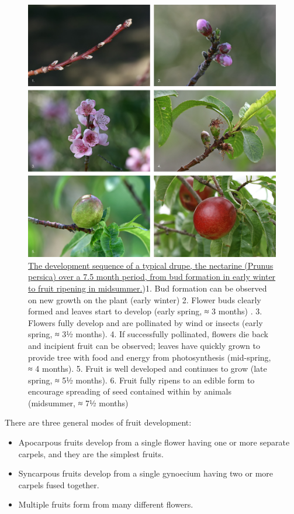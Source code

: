 \begin{figure}

{\centering \includegraphics[width=0.7\linewidth]{./figures/plants/Nectarine_Fruit_Development} 

}

\caption{\href{https://commons.wikimedia.org/wiki/File:Nectarine_Fruit_Development.jpg}{The development sequence of a typical drupe, the nectarine (Prunus persica) over a 7.5 month period, from bud formation in early winter to fruit ripening in midsummer.})1. Bud formation can be observed on new growth on the plant (early winter) 2. Flower buds clearly formed and leaves start to develop (early spring, ≈ 3 months) . 3. Flowers fully develop and are pollinated by wind or insects (early spring, ≈ 3½ months). 4. If successfully pollinated, flowers die back and incipient fruit can be observed; leaves have quickly grown to provide tree with food and energy from photosynthesis (mid-spring, ≈ 4 months). 5. Fruit is well developed and continues to grow (late spring, ≈ 5½ months). 6. Fruit fully ripens to an edible form to encourage spreading of seed contained within by animals (midsummer, ≈ 7½ months)}\label{fig:fruitdevelopment}
\end{figure}

There are three general modes of fruit development:

\begin{itemize}
\tightlist
\item
  Apocarpous fruits develop from a single flower having one or more separate carpels, and they are the simplest fruits.
\item
  Syncarpous fruits develop from a single gynoecium having two or more carpels fused together.
\item
  Multiple fruits form from many different flowers.
\end{itemize}

